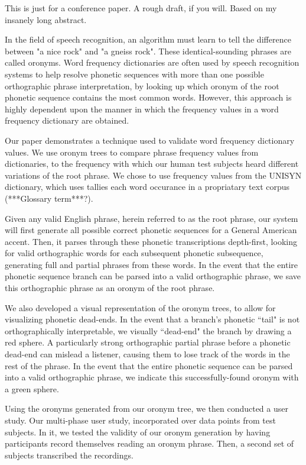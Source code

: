 This is just for a conference paper. A rough draft, if you will. Based on my insanely long abstract.

In the field of speech recognition, an algorithm must learn to tell the difference between "a nice rock" and "a gneiss rock". These identical-sounding phrases are called oronyms. Word frequency dictionaries are often used by speech recognition systems to help resolve phonetic sequences with more than one possible orthographic phrase interpretation, by looking up which oronym of the root phonetic sequence contains the most common words. However, this approach is highly dependent upon the manner in which the frequency values in a word frequency dictionary are obtained. 

Our paper demonstrates a technique used to validate word frequency dictionary values. We use oronym trees to compare phrase frequency values from dictionaries, to the frequency with which our human test subjects heard different variations of the root phrase. We chose to use frequency values from the UNISYN dictionary, which uses tallies each word occurance in a propriatary text corpus (***Glossary term***?).

Given any valid English phrase, herein referred to as the root phrase, our system will first generate all possible correct phonetic sequences for a General American accent. Then, it parses through these phonetic transcriptions depth-first, looking for valid orthographic words for each subsequent phonetic subsequence, generating full and partial phrases from these words.  In the event that the entire phonetic sequence branch can be parsed into a valid orthographic phrase, we save this orthographic phrase as an oronym of the root phrase.

We also developed a visual representation of the oronym trees, to allow for visualizing phonetic dead-ends.  In the event that a branch's phonetic ``tail" is not orthographically interpretable, we visually ``dead-end" the branch by drawing a red sphere. A particularly strong orthographic partial phrase before a phonetic dead-end can mislead a listener, causing them to lose track of the words in the rest of the phrase.   In the event that the entire phonetic sequence can be parsed into a valid orthographic phrase, we indicate this successfully-found oronym with a green sphere.  

Using the oronyms generated from our oronym tree, we then conducted a user study. Our multi-phase user study, incorporated over \numResponsesPhaseTwoUserStudy data points from \uniqueUsersPhaseTwoUserStudy test subjects.  In it, we tested the validity of our oronym generation by having participants record themselves reading an oronym phrase. Then, a second set of subjects transcribed the recordings.  

